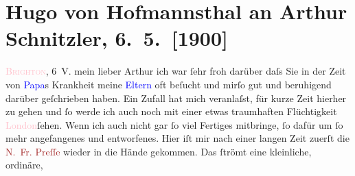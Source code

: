

               \section[Hugo von Hofmannsthal an Arthur Schnitzler, 6. 5. {[}1900{]}]{ Hugo von Hofmannsthal an Arthur Schnitzler, 6. 5. {[}1900{]}}\nopagebreak{}\rehead{ }\normalsize\beginnumbering{} \toendnotes[C]{\smallbreak\pagebreak[2]} 
\toendnotes[C]{\smallbreak}\pstart
           \raggedleft{}{\pb}\textcolor{pink}{\textsc{Brighton}}{}\ledrightnote{\textcolor{pink}{Brighton}},
                     6 V.\pend
           \pstart{}mein lieber Arthur\pend\pstart
           ich war ſehr froh darüber daſs Sie in der Zeit von \textcolor{blue}{Papa}{}s Krankheit meine \textcolor{blue}{Eltern}{} oft beſucht und \introOben{}mir\introOben{}{ }ſo gut und beruhigend darüber geſchrieben
               haben.\pend
           \pstart
           Ein Zufall hat mich veranlaſst, für kurze Zeit hierher zu gehen und ſo werde ich auch
               noch mit einer etwas traumhaften {\pb}Flüchtigkeit \textcolor{pink}{London}{}\ledrightnote{\textcolor{pink}{London}}{ }ſehen.\pend
           \pstart
           Wenn ich auch nicht gar ſo viel Fertiges mitbringe, ſo dafür um ſo mehr angefangenes
               und entworfenes.\pend
           \pstart
           Hier iſt mir nach einer langen Zeit zuerſt die \textcolor{brown}{N. Fr.
                  Preſſe}{}\ledrightnote{\textcolor{brown}{Neue Freie Presse}} wieder in die Hände gekommen. Das ſtrömt eine kleinliche, ordinäre,
